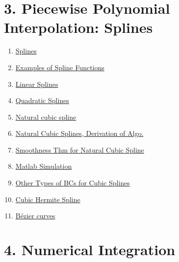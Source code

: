 \documentclass[11pt]{article}
\begin{document}
\vspace{-1cm}

\section*{3. Piecewise Polynomial Interpolation: Splines}

\vspace{-0.5cm}

\begin{multicols}{2}
	\begin{enumerate}
		\item \href{https://mp.weixin.qq.com/s/SKpBAnBLArmTadU5MLYrcw}{Splines}	%
		\item \href{https://mp.weixin.qq.com/s/wT0jvmxhTavpe5M1MSay1w}{Examples of Spline Functions}	%
		\item \href{https://mp.weixin.qq.com/s/OcFv0FlErxEPgyQUeFa24Q}{Linear Splines}	%
		\item \href{https://mp.weixin.qq.com/s/pXGhthhxw57NhTG1lCNWhg}{Quadratic Splines}	%
		\item \href{https://mp.weixin.qq.com/s/RwgTND4ozRQFIZOrQTSb1A}{Natural cubic spline}	%
		\item \href{https://mp.weixin.qq.com/s/jC8xpEFhZc-dcZbLsGqjVg}{Natural Cubic Splines, Derivation of Algo.}	%
		\item \href{https://mp.weixin.qq.com/s/HKCImmgLYY_QdKPrMJXBpw}{Smoothness Thm for Natural Cubic Spline}	%
		\item \href{https://mp.weixin.qq.com/s/nITJmQghAwXAtEFS5orRAQ}{Matlab Simulation}	%
		\item \href{https://mp.weixin.qq.com/s/4bpvHd4JuAQ4Nq89SnQ65A}{Other Types of BCs for Cubic Splines}	%
		\item \href{https://mp.weixin.qq.com/s/2NsOIcISB9OHfhv8BMKjeg}{Cubic Hermite Spline}	%
		\item \href{https://mp.weixin.qq.com/s/zWWRpdb7sFGYqTZd8sRScg}{B{\'e}zier curves}	%
	\end{enumerate}
\end{multicols}

\newpage

\section*{4. Numerical Integration}

\vspace{-0.5cm}
\end{document}
